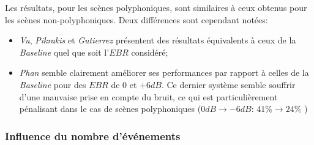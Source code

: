 Les résultats, pour les scènes polyphoniques, sont similaires à ceux obtenus pour les scènes non-polyphoniques. Deux différences sont cependant notées:

\begin{itemize}
\item  \emph{Vu}, \emph{Pikrakis} et \emph{Gutierrez} présentent des résultats équivalents à ceux de la \emph{Baseline} quel que soit l'$EBR$ considéré;
\item  \emph{Phan} semble clairement améliorer ses performances par rapport à celles de la \emph{Baseline} pour des $EBR$ de $0$ et $+6dB$. Ce dernier système semble souffrir d'une mauvaise prise en compte du bruit, ce qui est particulièrement pénalisant dans le cas de scènes polyphoniques ($0dB\rightarrow -6dB$: $41\%\rightarrow 24\%$ )
\end{itemize}

\subsubsection{Influence du nombre d'événements}

